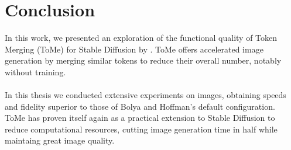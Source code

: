 \section{Conclusion}
In this work, we presented an exploration of the functional quality of Token Merging (ToMe) for Stable Diffusion by \cite{bolya2023tomesd}. ToMe offers accelerated image generation by merging similar tokens to reduce their overall number, notably without training.\\
\\
In this thesis we conducted extensive experiments on images, obtaining speeds and fidelity superior to those of Bolya and Hoffman's default configuration.\\
ToMe has proven itself again as a practical extension to Stable Diffusion to reduce computational resources, cutting image generation time in half while maintaing great image quality.\\
\\
